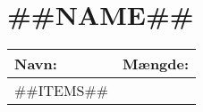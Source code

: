 \section*{##NAME##}

\begin{tabular}{|l|l|}
  \hline
  \bf{Navn:} & \bf{Mængde:} \\
  \hline\hline
  ##ITEMS##
  \hline
\end{tabular}
